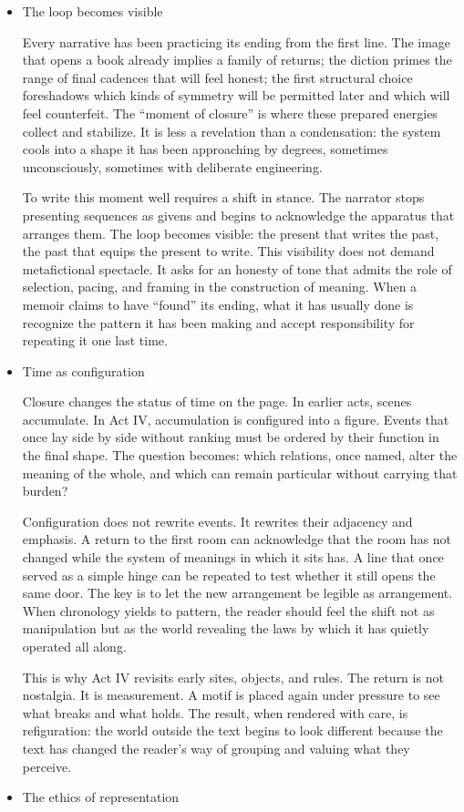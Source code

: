 \documentclass[11pt]{article}
\begin{document}
\begin{itemize}
\item The loop becomes visible
\label{sec:orgd53e96b}

Every narrative has been practicing its ending from the first line. The image that opens a book already implies a family of returns; the diction primes the range of final cadences that will feel honest; the first structural choice foreshadows which kinds of symmetry will be permitted later and which will feel counterfeit. The “moment of closure” is where these prepared energies collect and stabilize. It is less a revelation than a condensation: the system cools into a shape it has been approaching by degrees, sometimes unconsciously, sometimes with deliberate engineering.

To write this moment well requires a shift in stance. The narrator stops presenting sequences as givens and begins to acknowledge the apparatus that arranges them. The loop becomes visible: the present that writes the past, the past that equips the present to write. This visibility does not demand metafictional spectacle. It asks for an honesty of tone that admits the role of selection, pacing, and framing in the construction of meaning. When a memoir claims to have “found” its ending, what it has usually done is recognize the pattern it has been making and accept responsibility for repeating it one last time.
\item Time as configuration
\label{sec:org3b7691a}

Closure changes the status of time on the page. In earlier acts, scenes accumulate. In Act IV, accumulation is configured into a figure. Events that once lay side by side without ranking must be ordered by their function in the final shape. The question becomes: which relations, once named, alter the meaning of the whole, and which can remain particular without carrying that burden?

Configuration does not rewrite events. It rewrites their adjacency and emphasis. A return to the first room can acknowledge that the room has not changed while the system of meanings in which it sits has. A line that once served as a simple hinge can be repeated to test whether it still opens the same door. The key is to let the new arrangement be legible as arrangement. When chronology yields to pattern, the reader should feel the shift not as manipulation but as the world revealing the laws by which it has quietly operated all along.

This is why Act IV revisits early sites, objects, and rules. The return is not nostalgia. It is measurement. A motif is placed again under pressure to see what breaks and what holds. The result, when rendered with care, is refiguration: the world outside the text begins to look different because the text has changed the reader’s way of grouping and valuing what they perceive.
\item The ethics of representation
\label{sec:org30ce515}


\end{itemize}
\end{document}
